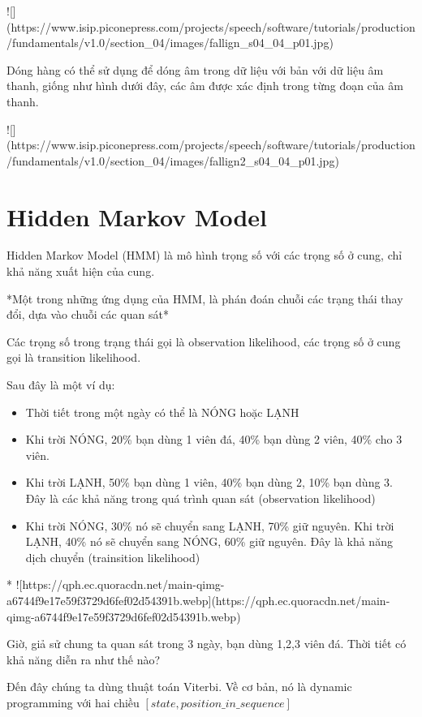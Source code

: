 ![](https://www.isip.piconepress.com/projects/speech/software/tutorials/production/fundamentals/v1.0/section_04/images/fallign_s04_04_p01.jpg)

Dóng hàng có thể sử dụng để dóng âm trong dữ liệu với bản với dữ liệu âm thanh, giống như hình dưới đây, các âm được xác định trong từng đoạn của âm thanh.

![](https://www.isip.piconepress.com/projects/speech/software/tutorials/production/fundamentals/v1.0/section_04/images/fallign2_s04_04_p01.jpg)

\section{Hidden Markov Model}

Hidden Markov Model (HMM) là mô hình trọng số với các trọng số ở cung, chỉ khả năng xuất hiện của cung.

*Một trong những ứng dụng của HMM, là phán đoán chuỗi các trạng thái thay đổi, dựa vào chuỗi các quan sát*

Các trọng số trong trạng thái gọi là observation likelihood, các trọng số ở cung gọi là transition likelihood.

Sau đây là một ví dụ:

\begin{itemize}
  \item Thời tiết trong một ngày có thể là NÓNG hoặc LẠNH
  \item Khi trời NÓNG, 20\% bạn dùng 1 viên đá, 40\% bạn dùng 2 viên, 40\% cho 3 viên.
  \item Khi trời LẠNH, 50\% bạn dùng 1 viên, 40\% bạn dùng 2, 10\% bạn dùng 3. Đây là các khả năng trong quá trình quan sát (observation likelihood)
  \item Khi trời NÓNG, 30\% nó sẽ chuyển sang LẠNH, 70\% giữ nguyên. Khi trời LẠNH, 40\% nó sẽ chuyển sang NÓNG, 60\% giữ nguyên. Đây là khả năng dịch chuyển (trainsition likelihood)
\end{itemize}

* ![https://qph.ec.quoracdn.net/main-qimg-a6744f9e17e59f3729d6fef02d54391b.webp](https://qph.ec.quoracdn.net/main-qimg-a6744f9e17e59f3729d6fef02d54391b.webp)

Giờ, giả sử chung ta quan sát trong 3 ngày, bạn dùng 1,2,3 viên đá. Thời tiết có khả năng diễn ra như thế nào?

Đến đây chúng ta dùng thuật toán Viterbi. Về cơ bản, nó là dynamic programming với hai chiều $[state, position\_in\_sequence]$

